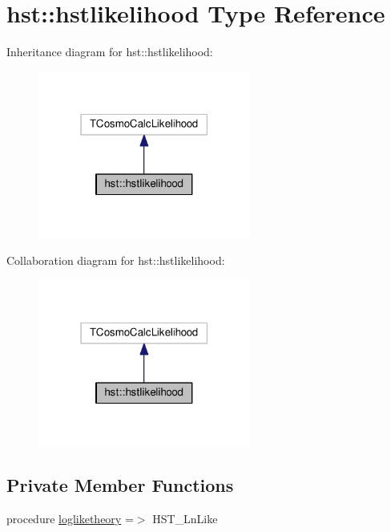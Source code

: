 \hypertarget{structhst_1_1hstlikelihood}{}\section{hst\+:\+:hstlikelihood Type Reference}
\label{structhst_1_1hstlikelihood}


Inheritance diagram for hst\+:\+:hstlikelihood\+:
\nopagebreak
\begin{figure}[H]
\begin{center}
\leavevmode
\includegraphics[width=198pt]{structhst_1_1hstlikelihood__inherit__graph}
\end{center}
\end{figure}


Collaboration diagram for hst\+:\+:hstlikelihood\+:
\nopagebreak
\begin{figure}[H]
\begin{center}
\leavevmode
\includegraphics[width=198pt]{structhst_1_1hstlikelihood__coll__graph}
\end{center}
\end{figure}
\subsection*{Private Member Functions}
\begin{DoxyCompactItemize}
\item 
procedure \mbox{\hyperlink{structhst_1_1hstlikelihood_ae3ffa536a09d701efd3f2b5070455a57}{logliketheory}} =$>$ H\+S\+T\+\_\+\+Ln\+Like
\end{DoxyCompactItemize}
